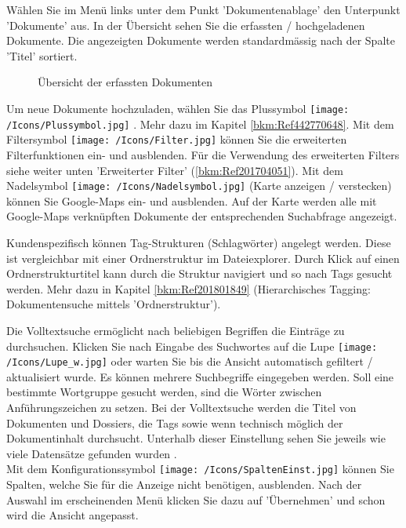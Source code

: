 Wählen Sie im Menü links unter dem Punkt 'Dokumentenablage' den Unterpunkt 'Dokumente' aus. In der Übersicht sehen Sie die erfassten / hochgeladenen Dokumente. Die angezeigten Dokumente werden standardmässig nach der Spalte 'Titel' sortiert. 

\begin{figure}[H]
\caption{Übersicht der erfassten Dokumenten}
\end{figure}

Um neue Dokumente hochzuladen, wählen Sie das Plussymbol \texttt{[image: /Icons/Plussymbol.jpg]} . Mehr dazu im Kapitel \ref{bkm:Ref442770648}. Mit dem Filtersymbol \texttt{[image: /Icons/Filter.jpg]}  können Sie die erweiterten Filterfunktionen ein- und ausblenden. Für die Verwendung des erweiterten Filters siehe weiter unten 'Erweiterter Filter' (\ref{bkm:Ref201704051}). Mit dem Nadelsymbol \texttt{[image: /Icons/Nadelsymbol.jpg]} (Karte anzeigen / verstecken) können Sie Google-Maps ein- und ausblenden. Auf der Karte werden alle mit Google-Maps verknüpften Dokumente der entsprechenden Suchabfrage angezeigt.\newline

Kundenspezifisch können Tag-Strukturen (Schlagwörter) angelegt werden. Diese ist vergleichbar mit einer Ordnerstruktur im Dateiexplorer. Durch Klick auf einen Ordnerstrukturtitel  kann durch die Struktur navigiert und so nach Tags gesucht werden. Mehr dazu in Kapitel \ref{bkm:Ref201801849} (Hierarchisches Tagging: Dokumentensuche mittels 'Ordnerstruktur'). \newline

Die Volltextsuche  ermöglicht nach beliebigen Begriffen die Einträge zu durchsuchen. Klicken Sie nach Eingabe des Suchwortes auf die Lupe \texttt{[image: /Icons/Lupe\_w.jpg]}  oder warten Sie bis die Ansicht automatisch gefiltert / aktualisiert wurde. Es können mehrere Suchbegriffe eingegeben werden. Soll eine bestimmte Wortgruppe gesucht werden, sind die Wörter zwischen Anführungszeichen zu setzen. Bei der Volltextsuche werden die Titel von Dokumenten und Dossiers, die Tags sowie wenn technisch möglich der Dokumentinhalt durchsucht. Unterhalb dieser Einstellung sehen Sie jeweils wie viele Datensätze gefunden wurden .\\
Mit dem Konfigurationssymbol \texttt{[image: /Icons/SpaltenEinst.jpg]}  können Sie Spalten, welche Sie für die Anzeige nicht benötigen, ausblenden. Nach der Auswahl im erscheinenden Menü klicken Sie dazu auf 'Übernehmen' und schon wird die Ansicht angepasst. \newline

